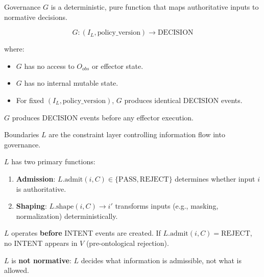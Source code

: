 \begin{definition}
Governance $G$ is a deterministic, pure function that maps authoritative inputs to normative decisions.

$$G: (I_L, \text{policy\_version}) \to \text{DECISION}$$

where:
\begin{itemize}
  \item $G$ has no access to $O_{obs}$ or effector state.
  \item $G$ has no internal mutable state.
  \item For fixed $(I_L, \text{policy\_version})$, $G$ produces identical DECISION events.
\end{itemize}

$G$ produces DECISION events before any effector execution.
\end{definition}

\begin{definition}[Boundaries L]
Boundaries $L$ are the constraint layer controlling information flow into governance.

$L$ has two primary functions:
\begin{enumerate}
  \item \textbf{Admission}: $L.\text{admit}(i, C) \in \{\text{PASS}, \text{REJECT}\}$ determines whether input $i$ is authoritative.
  \item \textbf{Shaping}: $L.\text{shape}(i, C) \to i'$ transforms inputs (e.g., masking, normalization) deterministically.
\end{enumerate}

$L$ operates \textbf{before} INTENT events are created. If $L.\text{admit}(i, C) = \text{REJECT}$, no INTENT appears in $V$ (pre-ontological rejection).

$L$ is \textbf{not normative}: $L$ decides what information is admissible, not what is allowed.
\end{definition}


